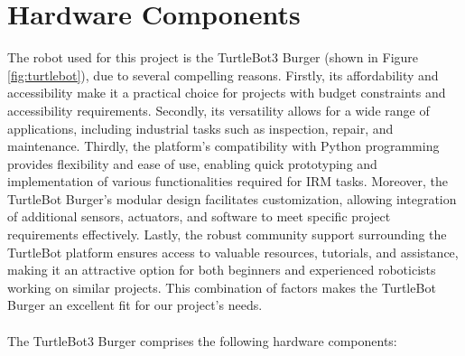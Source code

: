 \documentclass{article}
\begin{document}
\section{Hardware Components}
The robot used for this project is the TurtleBot3 Burger (shown in Figure \ref{fig:turtlebot}), due to several compelling reasons.
Firstly, its affordability and accessibility make it a practical choice for projects with budget constraints and accessibility requirements. 
Secondly, its versatility allows for a wide range of applications, including industrial tasks such as inspection, repair, and maintenance. 
Thirdly, the platform's compatibility with Python programming provides flexibility and ease of use, enabling quick prototyping and implementation of various functionalities required for IRM tasks. 
Moreover, the TurtleBot Burger's modular design facilitates customization, allowing integration of additional sensors, actuators, and software to meet specific project requirements effectively.
Lastly, the robust community support surrounding the TurtleBot platform ensures access to valuable resources, tutorials, and assistance, making it an attractive option for both beginners and experienced roboticists working on similar projects. This combination of factors makes the TurtleBot Burger an excellent fit for our project's needs.
\\ \\
The TurtleBot3 Burger comprises the following hardware components:
\end{document}
